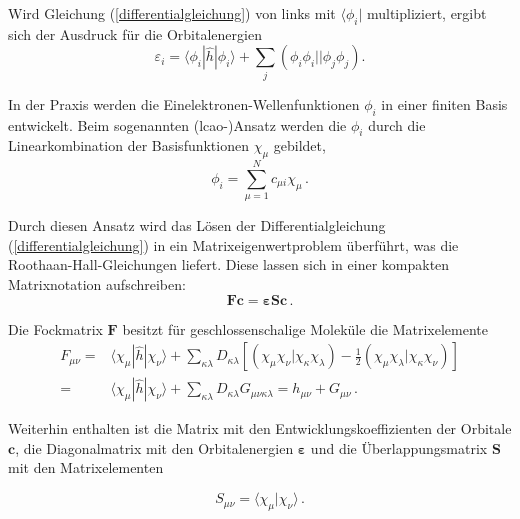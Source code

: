 Wird Gleichung (\ref{differentialgleichung}) von links mit $\langle\phi_i\vert$ multipliziert, ergibt sich der Ausdruck für die Orbitalenergien
\begin{equation}
\varepsilon_i = \langle\phi_i|\hat{h}|\phi_i\rangle + \sum_j\left(\phi_i\phi_i||\phi_j\phi_j\right).
\label{orbitalenergie}
\end{equation}

In der Praxis werden die Einelektronen-Wellenfunktionen $\phi_i$ in einer finiten Basis entwickelt. Beim sogenannten \mbox{(\acs{lcao}-)}Ansatz werden die $\phi_i$ durch die Linearkombination der Basisfunktionen $\chi_\mu$ gebildet,
\begin{equation}
\phi_i=\sum_{\mu=1}^Nc_{\mu i}\chi_{\mu}\,.
\end{equation}

Durch diesen Ansatz wird das Lösen der Differentialgleichung (\ref{differentialgleichung}) in ein Matrix\-eigenwertproblem überführt, was die Roothaan-Hall-Gleichungen\supercite{roothaan1951new,hall1951molecular} liefert. Diese lassen sich in einer kompakten Matrixnotation aufschreiben:
\begin{equation}\label{roothaanhall}
\boldsymbol{Fc}=\boldsymbol{\varepsilon Sc}\,.
\end{equation}

Die Fockmatrix $\boldsymbol{F}$ besitzt für geschlossenschalige Moleküle die Matrixelemente
\begin{equation}
\begin{aligned}
F_{\mu\nu} =& \langle\chi_{\mu}|\hat{h}|\chi_{\nu}\rangle + \sum_{\kappa\lambda}D_{\kappa\lambda}\left[\left(\chi_{\mu}\chi_{\nu}|\chi_{\kappa}\chi_{\lambda}\right)-\frac{1}{2}\left(\chi_{\mu}\chi_{\lambda}|\chi_{\kappa}\chi_{\nu}\right)\right]\\
=&\langle\chi_{\mu}|\hat{h}|\chi_{\nu}\rangle + \sum_{\kappa\lambda}D_{\kappa\lambda}G_{\mu\nu\kappa\lambda}=h_{\mu\nu}+G_{\mu\nu}\, .
\end{aligned}
\label{fockmatrix}
\end{equation}

Weiterhin enthalten ist die Matrix mit den Entwicklungskoeffizienten der Orbitale $\boldsymbol{c}$, die Diagonalmatrix mit den Orbitalenergien $\boldsymbol{\varepsilon}$ und die Überlappungsmatrix $\boldsymbol{S}$ mit den Matrixelementen

\begin{equation}
S_{\mu\nu}=\langle\chi_{\mu}|\chi_{\nu}\rangle\, .
\end{equation}


